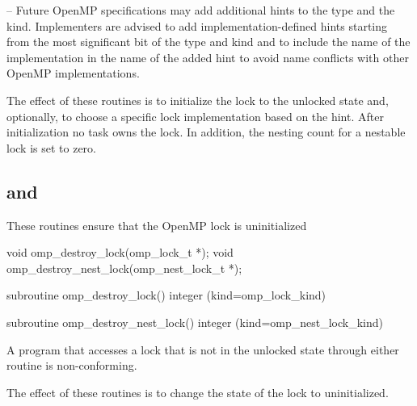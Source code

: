 \notestart
\noteheader – Future OpenMP specifications may add additional hints to the 
 type and the  kind.  
Implementers are advised to add implementation-defined hints starting from 
the most significant bit of the  type and
 kind and to include the name of the 
implementation in the name of the added hint to avoid name conflicts 
with other OpenMP implementations.
\noteend


\effect
The effect of these routines is to initialize the lock to the unlocked state and, optionally, to choose a specific lock implementation based on the hint. 
After initialization no task owns the lock. In addition, the nesting count for a nestable lock is set to zero.




\subsection[\code{omp\_destroy\_lock} and \code{omp\_destroy\_nest\_lock}]{ and\\ }
\label{subsec:omp_destroy_lock and omp_destroy_nest_lock}
\summary
These routines ensure that the OpenMP lock is uninitialized

\format
\ccppspecificstart
\begin{boxedcode}
void omp\_destroy\_lock(omp\_lock\_t *);
void omp\_destroy\_nest\_lock(omp\_nest\_lock\_t *);
\end{boxedcode}
\ccppspecificend

\fortranspecificstart
\begin{boxedcode}
subroutine omp\_destroy\_lock()
integer (kind=omp\_lock\_kind) 

subroutine omp\_destroy\_nest\_lock()
integer (kind=omp\_nest\_lock\_kind) 
\end{boxedcode}
\fortranspecificend

\constraints
A program that accesses a lock that is not in the unlocked state through either routine is 
non-conforming.

\effect
The effect of these routines is to change the state of the lock to uninitialized.










